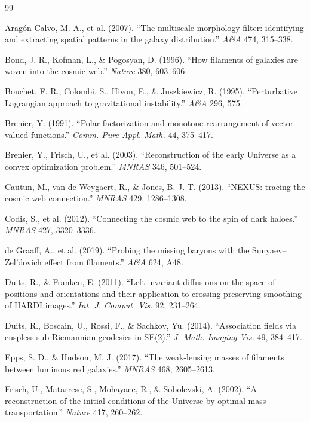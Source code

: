 \documentclass[11pt]{article}
\begin{document}
\begin{thebibliography}{99}

 Arag\'{o}n-Calvo, M. A., et al. (2007). ``The multiscale morphology filter: identifying and extracting spatial patterns in the galaxy distribution.'' \emph{A\&A} 474, 315--338.

 Bond, J. R., Kofman, L., \& Pogosyan, D. (1996). ``How filaments of galaxies are woven into the cosmic web.'' \emph{Nature} 380, 603--606.

 Bouchet, F. R., Colombi, S., Hivon, E., \& Juszkiewicz, R. (1995). ``Perturbative Lagrangian approach to gravitational instability.'' \emph{A\&A} 296, 575.

 Brenier, Y. (1991). ``Polar factorization and monotone rearrangement of vector-valued functions.'' \emph{Comm. Pure Appl. Math.} 44, 375--417.

 Brenier, Y., Frisch, U., et al. (2003). ``Reconstruction of the early Universe as a convex optimization problem.'' \emph{MNRAS} 346, 501--524.

 Cautun, M., van de Weygaert, R., \& Jones, B. J. T. (2013). ``NEXUS: tracing the cosmic web connection.'' \emph{MNRAS} 429, 1286--1308.

 Codis, S., et al. (2012). ``Connecting the cosmic web to the spin of dark haloes.'' \emph{MNRAS} 427, 3320--3336.

 de Graaff, A., et al. (2019). ``Probing the missing baryons with the Sunyaev--Zel'dovich effect from filaments.'' \emph{A\&A} 624, A48.

 Duits, R., \& Franken, E. (2011). ``Left-invariant diffusions on the space of positions and orientations and their application to crossing-preserving smoothing of HARDI images.'' \emph{Int. J. Comput. Vis.} 92, 231--264.

 Duits, R., Boscain, U., Rossi, F., \& Sachkov, Yu. (2014). ``Association fields via cuspless sub-Riemannian geodesics in SE(2).'' \emph{J. Math. Imaging Vis.} 49, 384--417.

 Epps, S. D., \& Hudson, M. J. (2017). ``The weak-lensing masses of filaments between luminous red galaxies.'' \emph{MNRAS} 468, 2605--2613.

 Frisch, U., Matarrese, S., Mohayaee, R., \& Sobolevski, A. (2002). ``A reconstruction of the initial conditions of the Universe by optimal mass transportation.'' \emph{Nature} 417, 260--262.


\end{thebibliography}
\end{document}
